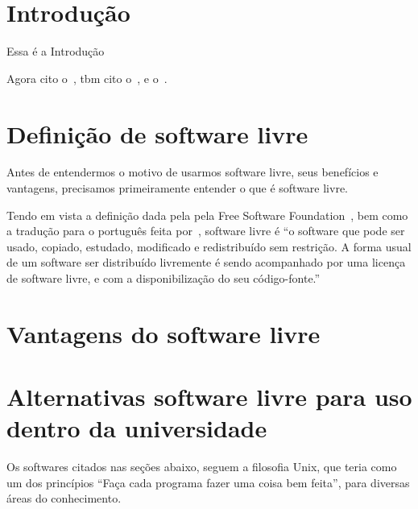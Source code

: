 \documentclass[
	article,			%
	12pt,				%
	oneside,			%
	a4paper,			%
	english,			%
	brazil,				%
	sumario=tradicional
	]{abntex2}
\begin{document}
\cleardoublepage
{}
\tableofcontents*
\listoffigures
\listoftables
\cleardoublepage


\textual
\section{Introdução}\label{Introdução}

Essa é a Introdução

Agora cito o~\cite{definicao}, tbm cito o~\cite{uso_de_linux}, e o~\cite{vantagens}.

\cite{site-fsf}

\section{Definição de software livre}\label{Definição de software livre}
Antes de entendermos o motivo de usarmos software livre, seus benefícios e vantagens, precisamos primeiramente entender o que é software livre.

Tendo em vista a definição dada pela pela Free Software Foundation~\cite{site-fsf}, bem como a tradução para o português feita por~\cite{definicao}, software livre é ``o software que pode ser usado, copiado, estudado, modificado e redistribuído sem restrição. A forma usual de um software ser distribuído livremente é sendo acompanhado por uma licença de software livre, e com a disponibilização do seu código-fonte.''

\section{Vantagens do software livre}\label{Vantagens do software livre}

\section{Alternativas software livre para uso dentro da universidade}\label{Alternativas software livre para uso dentro da universidade}

Os softwares citados nas seções abaixo, seguem a filosofia Unix, que teria como um dos princípios ``Faça cada programa fazer uma coisa bem feita''\cite{filosofia_unix}, para diversas áreas do conhecimento.
\end{document}

